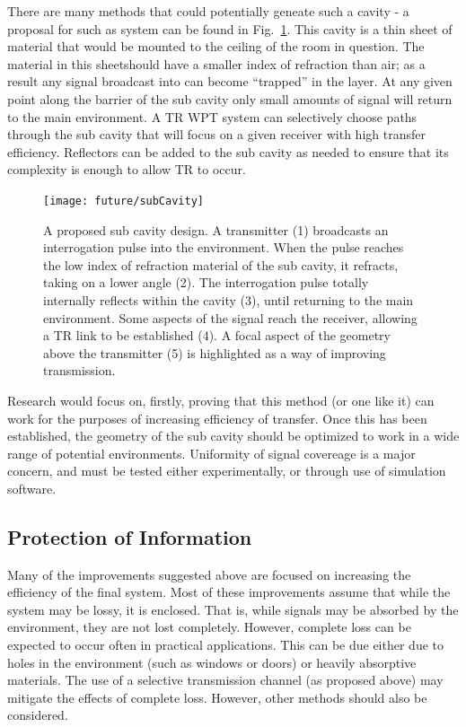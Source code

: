 There are many methods that could potentially geneate such a cavity - a proposal for such as system can be found in Fig.~\ref{fig:subCav}. This cavity is a thin sheet of material that would be mounted to the ceiling of the room in question. The material in this sheetshould have a smaller index of refraction than air; as a result any signal broadcast into can become ``trapped'' in the layer. At any given point along the barrier of the sub cavity only small amounts of signal will return to the main environment. A TR WPT system can selectively choose paths through the sub cavity that will focus on a given receiver with high transfer efficiency. Reflectors can be added to the sub cavity as needed to ensure that its complexity is enough to allow TR to occur.

\begin{figure}[h]
\texttt{[image: future/subCavity]}
\caption[Proposed ``Sub Cavity Design'']{A proposed sub cavity design. A transmitter (1) broadcasts an interrogation pulse into the environment. When the pulse reaches the low index of refraction material of the sub cavity, it refracts, taking on a lower angle (2). The interrogation pulse totally internally reflects within the cavity (3), until returning to the main environment. Some aspects of the signal reach the receiver, allowing a TR link to be established (4). A focal aspect of the geometry above the transmitter (5) is highlighted as a way of improving transmission.}
\label{fig:subCav}
\end{figure}

Research would focus on, firstly, proving that this method (or one like it) can work for the purposes of increasing efficiency of transfer. Once this has been established, the geometry of the sub cavity should be optimized to work in a wide range of potential environments. Uniformity of signal covereage is a major concern, and must be tested either experimentally, or through use of simulation software.

\subsection{Protection of Information}

Many of the improvements suggested above are focused on increasing the efficiency of the final system. Most of these improvements assume that while the system may be lossy, it is enclosed. That is, while signals may be absorbed by the environment, they are not lost completely. However, complete loss can be expected to occur often in practical applications. This can be due either due to holes in the environment (such as windows or doors) or heavily absorptive materials. The use of a selective transmission channel (as proposed above) may mitigate the effects of complete loss.  However, other methods should also be considered.

